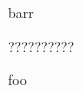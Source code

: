 \documentclass{article}
\begin{document}
barr
\begin{CJK}{UTF8}
??????????
\end{CJK}
foo
\end{document}
